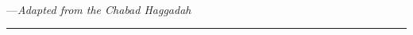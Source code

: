 \documentclass[a4paper,10pt,openany]{memoir}
\newcommand{\HgEllipsis}{\ensuremath{\left[\ldots\right]}}
\newcommand{\HgSource}[1]{\hfill{\small---\itshape{#1}}}
\newcommand{\HgFill}{\vfill \hrule \vfill}
\newenvironment{HgEnglish}{\strut\\\noindent}{\vspace{1em}}
\begin{document}
\begin{HgEnglish}
%
%
%
%
%
%
%
%

\HgSource{Adapted from the Chabad Haggadah}
\end{HgEnglish}

\HgFill
\end{document}
